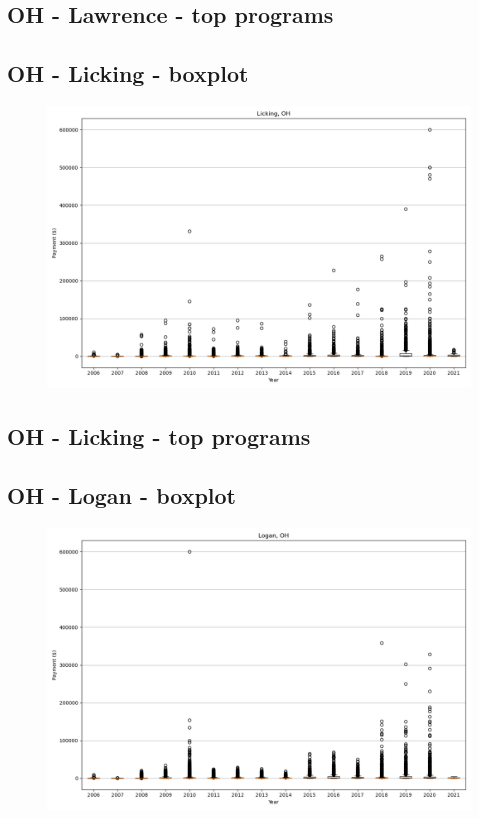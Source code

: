 \subsection*{OH - Lawrence - top programs}

\newpage
\subsection*{OH - Licking - boxplot}
\begin{figure}[h]
\centering
\includegraphics[width=7in]{../output/boxplots/counties/Licking-OH_boxplot.png}
\end{figure}


\subsection*{OH - Licking - top programs}

\newpage
\subsection*{OH - Logan - boxplot}
\begin{figure}[h]
\centering
\includegraphics[width=7in]{../output/boxplots/counties/Logan-OH_boxplot.png}
\end{figure}


